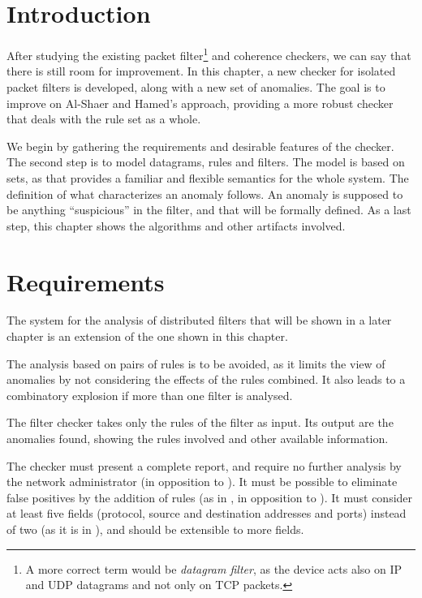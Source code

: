
\section{Introduction}

After studying the existing packet filter\footnote{A more correct term would be
\emph{datagram filter}, as the device acts also on IP and UDP datagrams
and not only on TCP packets.}
and coherence checkers, we can say
that there is still room for improvement. In this chapter, a new checker for
isolated packet filters is developed, along with a new set of anomalies. The
goal is to improve on Al-Shaer and Hamed's approach, providing a more robust checker
that deals with the rule set as a whole.

We begin by gathering the requirements and desirable features of the checker.
The second step is to model datagrams, rules and filters. The model is based on
sets, as that provides a familiar and flexible semantics for the whole system.
The definition of what characterizes an anomaly follows. An anomaly is supposed
to be anything ``suspicious'' in the filter, and that will be formally defined.
As a last step, this chapter shows the algorithms and other artifacts involved.



\section{Requirements}

The system for the analysis of distributed filters that will be shown in a later
chapter is an extension of the one shown in this chapter.

The analysis based on pairs of rules is to be avoided,
as it limits the view of anomalies by not considering the
effects of the rules combined. It also leads to a combinatory explosion if
more than one filter is analysed.

The filter checker takes only the rules of the filter as input.  Its output are
the anomalies found, showing the rules involved and other available information.

The checker must present a complete report, and require no further analysis by the
network administrator (in opposition to \cite{MayWooZis-Fang-00}). It must be
possible to eliminate false positives by the addition of rules (as in
\cite{Hari-Detecting-00}, in opposition to \cite{AlSHam-Fpa-03}). It must
consider at least five fields (protocol, source and destination addresses and
ports) instead of two (as it is in
\cite{Eppstein-Rectangle-01,Su-SegmentTree-00}), and should be extensible to
more fields.

